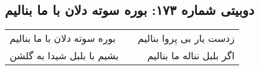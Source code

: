 \begin{center}
\section*{دوبیتی شماره ۱۷۳: بوره سوته دلان با ما بنالیم}
\label{sec:173}
\begin{longtable}{l p{0.5cm} r}
بوره سوته دلان با ما بنالیم
&&
زدست یار بی پروا بنالیم
\\
بشیم با بلبل شیدا به گلشن
&&
اگر بلبل نناله ما بنالیم
\\
\end{longtable}
\end{center}
